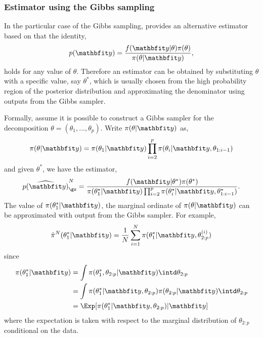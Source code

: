 \subsubsection{Estimator using the Gibbs sampling}
\label{ssub:Estimator using the Gibbs sampling}

In the particular case of the Gibbs sampling, \cite{Chib:1995em} provides an alternative estimator based on that the identity,
\begin{equation}
  p(\data) = \frac{f(\data|\theta)\pi(\theta)}{\pi(\theta|\data)},
\end{equation}
holds for any value of $\theta$. Therefore an estimator can be obtained by substituting $\theta$ with a specific value, say $\theta^*$, which is usually chosen from the high probability region of the posterior distribution and approximating the denominator using outputs from the Gibbs sampler.

Formally, assume it is possible to construct a Gibbs sampler for the decomposition $\theta = (\theta_1,\dots,\theta_p)$. Write $\pi(\theta|\data)$ as,
\begin{equation}
  \pi(\theta|\data) = \pi(\theta_1|\data)
  \prod_{i=2}^p\pi(\theta_i|\data,\theta_{1:i-1})
\end{equation}
and given $\theta^*$, we have the estimator,
\begin{equation}
  \widehat{p(\data)}_{\gs}^N = \frac{f(\data|\theta^*)\pi(\theta^*)}
  {\pi(\theta_1^*|\data)
    \prod_{i=2}^p\pi(\theta_i^*|\data,\theta_{1:i-1}^*)}.
\end{equation}
The value of $\pi(\theta_1^*|\data)$, the marginal ordinate of $\pi(\theta|\data)$ can be approximated with output from the Gibbs sampler. For example,
\begin{equation}
  \hat\pi^N(\theta_1^*|\data)
  = \frac{1}{N}\sum_{i=1}^N \pi(\theta_1^*|\data,\theta_{2:p}^{(i)})
  \label{eq:est gibbs first}
\end{equation}
since
\begin{align*}
  \pi(\theta_1^*|\data)
  &= \int\pi(\theta_1^*, \theta_{2:p}|\data)\intd\theta_{2:p} \\
  &= \int\pi(\theta_1^*|\data,\theta_{2:p})
  \pi(\theta_{2:p}|\data)\intd\theta_{2:p} \\
  &= \Exp[\pi(\theta_1^*|\data,\theta_{2:p})|\data]
\end{align*}
where the expectation is taken with respect to the marginal distribution of $\theta_{2:p}$ conditional on the data.

